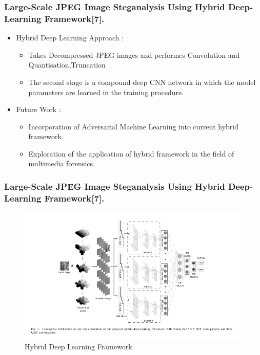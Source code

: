 \documentclass{beamer} %
\theoremstyle{definition} %
\begin{document}
\begin{frame}
\frametitle{Large-Scale JPEG Image Steganalysis Using Hybrid Deep-Learning Framework[7].}
\begin{itemize}
\item Hybrid Deep Learning Approach :
\begin{itemize}
	\item Takes Decompressed JPEG images and performes Convolution and Quantisation,Truncation
	\item The second stage is a compound deep CNN network in which the model parameters are learned in the training procedure.
\end{itemize}
\item Future Work : 
\begin{itemize}
	\item Incorporation of Adversarial Machine Learning into current hybrid framework.
	\item Exploration of the application of hybrid framework in
	the field of multimedia forensics.
\end{itemize}
\end{itemize}
\end{frame}

\begin{frame}
\frametitle{Large-Scale JPEG Image Steganalysis Using Hybrid Deep-Learning Framework[7].}

\begin{figure}
	\includegraphics[scale=0.3]{jpegStegAnalysis.png}
	\caption{Hybrid Deep Learning Framework.}
\end{figure}
\end{frame}
\end{document}
